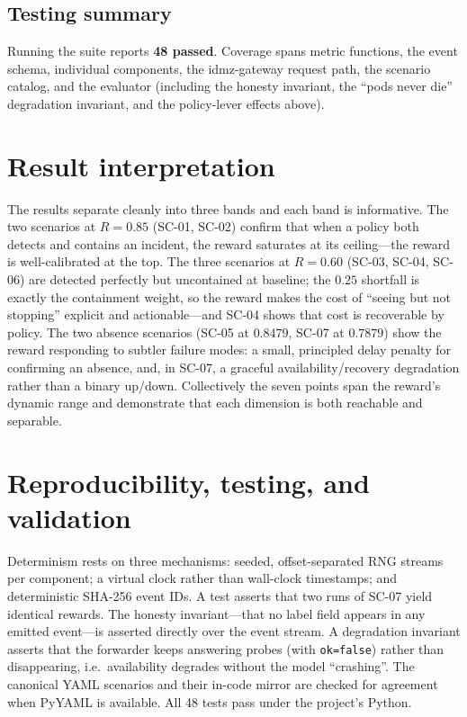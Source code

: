 \documentclass[11pt]{article}
\newcommand{\code}[1]{\texttt{\small #1}}
\begin{document}
\subsection{Testing summary}
Running the suite reports \textbf{48 passed}. Coverage spans metric functions,
the event schema, individual components, the idmz-gateway request path, the
scenario catalog, and the evaluator (including the honesty invariant, the
``pods never die'' degradation invariant, and the policy-lever effects above).

\section{Result interpretation}
The results separate cleanly into three bands and each band is informative. The
two scenarios at $R=0.85$ (SC-01, SC-02) confirm that when a policy both detects
and contains an incident, the reward saturates at its ceiling---the reward is
well-calibrated at the top. The three scenarios at $R=0.60$ (SC-03, SC-04, SC-06)
are detected perfectly but uncontained at baseline; the $0.25$ shortfall is
exactly the containment weight, so the reward makes the cost of ``seeing but not
stopping'' explicit and actionable---and SC-04 shows that cost is recoverable by
policy. The two absence scenarios (SC-05 at $0.8479$, SC-07 at $0.7879$) show the
reward responding to subtler failure modes: a small, principled delay penalty for
confirming an absence, and, in SC-07, a graceful availability/recovery
degradation rather than a binary up/down. Collectively the seven points span the
reward's dynamic range and demonstrate that each dimension is both reachable and
separable.

\section{Reproducibility, testing, and validation}
Determinism rests on three mechanisms: seeded, offset-separated RNG streams per
component; a virtual clock rather than wall-clock timestamps; and deterministic
SHA-256 event IDs. A test asserts that two runs of SC-07 yield identical rewards.
The honesty invariant---that no label field appears in any emitted event---is
asserted directly over the event stream. A degradation invariant asserts that the
forwarder keeps answering probes (with \code{ok=false}) rather than disappearing,
i.e.\ availability degrades without the model ``crashing''. The canonical YAML
scenarios and their in-code mirror are checked for agreement when PyYAML is
available. All 48 tests pass under the project's Python.
\end{document}
